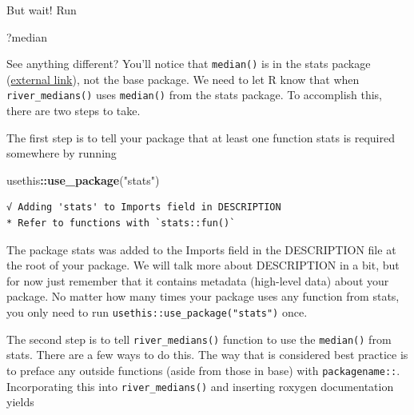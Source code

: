 \documentclass[
]{book}
\newenvironment{Shaded}{\begin{snugshade}}{\end{snugshade}}
\newcommand{\KeywordTok}[1]{\textcolor[rgb]{0.13,0.29,0.53}{\textbf{#1}}}
\newcommand{\NormalTok}[1]{#1}
\newcommand{\OperatorTok}[1]{\textcolor[rgb]{0.81,0.36,0.00}{\textbf{#1}}}
\newcommand{\StringTok}[1]{\textcolor[rgb]{0.31,0.60,0.02}{#1}}
\begin{document}
But wait! Run

\begin{Shaded}
\begin{Highlighting}[]
\NormalTok{?median}
\end{Highlighting}
\end{Shaded}

See anything different? You'll notice that \texttt{median()} is in the stats package (\href{https://stat.ethz.ch/R-manual/R-devel/library/stats/html/00Index.html}{external link}), not the base package. We need to let R know that when \texttt{river\_medians()} uses \texttt{median()} from the stats package. To accomplish this, there are two steps to take.

The first step is to tell your package that at least one function stats is required somewhere by running

\begin{Shaded}
\begin{Highlighting}[]
\NormalTok{usethis}\OperatorTok{::}\KeywordTok{use_package}\NormalTok{(}\StringTok{"stats"}\NormalTok{)}
\end{Highlighting}
\end{Shaded}

\begin{verbatim}
√ Adding 'stats' to Imports field in DESCRIPTION
* Refer to functions with `stats::fun()`
\end{verbatim}

The package stats was added to the Imports field in the DESCRIPTION file at the root of your package. We will talk more about DESCRIPTION in a bit, but for now just remember that it contains metadata (high-level data) about your package. No matter how many times your package uses any function from stats, you only need to run \texttt{usethis::use\_package("stats")} once.

The second step is to tell \texttt{river\_medians()} function to use the \texttt{median()} from stats. There are a few ways to do this. The way that is considered best practice is to preface any outside functions (aside from those in base) with \texttt{packagename::}. Incorporating this into \texttt{river\_medians()} and inserting roxygen documentation yields
\end{document}
